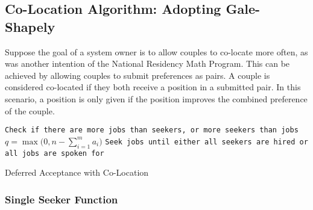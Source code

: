 \subsection{Co-Location Algorithm: Adopting Gale-Shapely}

Suppose the goal of a system owner is to allow couples to co-locate more often, as was another intention of the National Residency Math Program. This can be achieved by allowing couples to submit preferences as pairs. A couple is considered co-located if they both receive a position in a submitted pair. In this scenario, a position is only given if the position improves the combined preference of the couple.

\begin{algorithm}[H]
\SetAlgoLined
{} 
 \texttt{Check if there are more jobs than seekers, or more seekers than jobs} \;
 $q = \max \big(0, n - \sum_{i = 1}^m a_i \big)$\;
 \texttt{Seek jobs until either all seekers are hired or all jobs are spoken for} \;
 \caption{Deferred Acceptance with Co-Location}
\end{algorithm}

\subsubsection{Single Seeker Function}

